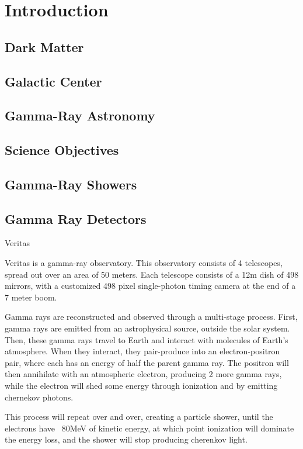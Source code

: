 \cleartooddpage[\thispagestyle{empty}]
\chapter{Introduction}


\section{Dark Matter}

\section{Galactic Center}

\section{Gamma-Ray Astronomy}

\section{Science Objectives}

\section{Gamma-Ray Showers}
\section{Gamma Ray Detectors}

Veritas

Veritas is a gamma-ray observatory.
This observatory consists of 4 telescopes, spread out over an area of 50 meters.
Each telescope consists of a 12m dish of 498 mirrors, with a customized 498 pixel single-photon timing camera at the end of a 7 meter boom.

Gamma rays are reconstructed and observed through a multi-stage process.
First, gamma rays are emitted from an astrophysical source, outside the solar system.
Then, these gamma rays travel to Earth and interact with molecules of Earth's atmosphere.
When they interact, they pair-produce into an electron-positron pair, where each has an energy of half the parent gamma ray.
The positron will then annihilate with an atmospheric electron, producing 2 more gamma rays, while the electron will shed some energy through ionization and by emitting chernekov photons.

This process will repeat over and over, creating a particle shower, until the electrons have ~80MeV of kinetic energy, at which point ionization will dominate the energy loss, and the shower will stop producing cherenkov light.

